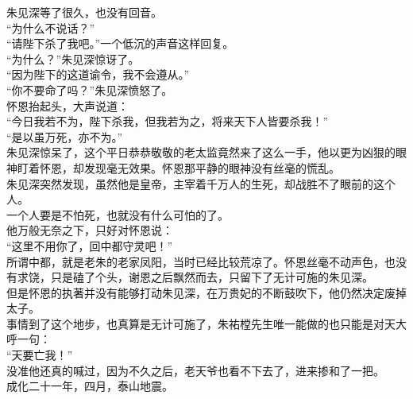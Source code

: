 \begin{multicols}{\theparacolNo}
朱见深等了很久，也没有回音。\\

“为什么不说话？”\\

“请陛下杀了我吧。”一个低沉的声音这样回复。\\

“为什么？”朱见深惊讶了。\\

“因为陛下的这道谕令，我不会遵从。”\\

“你不要命了吗？”朱见深愤怒了。\\

怀恩抬起头，大声说道：\\

“今日我若不为，陛下杀我，但我若为之，将来天下人皆要杀我！”\\

“是以虽万死，亦不为。”\\

朱见深惊呆了，这个平日恭恭敬敬的老太监竟然来了这么一手，他以更为凶狠的眼神盯着怀恩，却发现毫无效果。怀恩那平静的眼神没有丝毫的慌乱。\\

朱见深突然发现，虽然他是皇帝，主宰着千万人的生死，却战胜不了眼前的这个人。\\

一个人要是不怕死，也就没有什么可怕的了。\\

他万般无奈之下，只好对怀恩说：\\

“这里不用你了，回中都守灵吧！”\\

所谓中都，就是老朱的老家凤阳，当时已经比较荒凉了。怀恩丝毫不动声色，也没有求饶，只是磕了个头，谢恩之后飘然而去，只留下了无计可施的朱见深。\\

但是怀恩的执著并没有能够打动朱见深，在万贵妃的不断鼓吹下，他仍然决定废掉太子。\\

事情到了这个地步，也真算是无计可施了，朱祐樘先生唯一能做的也只能是对天大呼一句：\\

“天要亡我！”\\

没准他还真的喊过，因为不久之后，老天爷也看不下去了，进来掺和了一把。\\

成化二十一年，四月，泰山地震。\\


\end{multicols}
